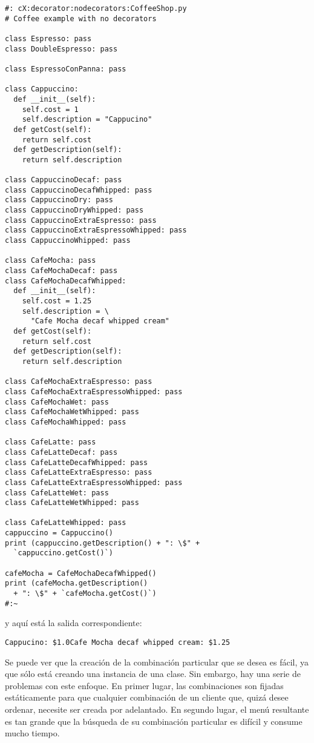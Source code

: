 \begin{lstlisting}
#: cX:decorator:nodecorators:CoffeeShop.py 
# Coffee example with no decorators 

class Espresso: pass 
class DoubleEspresso: pass

class EspressoConPanna: pass 

class Cappuccino: 
  def __init__(self): 
    self.cost = 1 
    self.description = "Cappucino" 
  def getCost(self): 
    return self.cost 
  def getDescription(self): 
    return self.description 
    
class CappuccinoDecaf: pass 
class CappuccinoDecafWhipped: pass 
class CappuccinoDry: pass 
class CappuccinoDryWhipped: pass 
class CappuccinoExtraEspresso: pass 
class CappuccinoExtraEspressoWhipped: pass 
class CappuccinoWhipped: pass 

class CafeMocha: pass 
class CafeMochaDecaf: pass 
class CafeMochaDecafWhipped: 
  def __init__(self): 
    self.cost = 1.25 
    self.description = \ 
      "Cafe Mocha decaf whipped cream" 
  def getCost(self): 
    return self.cost 
  def getDescription(self): 
    return self.description 
    
class CafeMochaExtraEspresso: pass 
class CafeMochaExtraEspressoWhipped: pass 
class CafeMochaWet: pass 
class CafeMochaWetWhipped: pass 
class CafeMochaWhipped: pass 

class CafeLatte: pass 
class CafeLatteDecaf: pass 
class CafeLatteDecafWhipped: pass 
class CafeLatteExtraEspresso: pass 
class CafeLatteExtraEspressoWhipped: pass 
class CafeLatteWet: pass 
class CafeLatteWetWhipped: pass 

class CafeLatteWhipped: pass 
cappuccino = Cappuccino() 
print (cappuccino.getDescription() + ": \$" +  
  `cappuccino.getCost()`) 
  
cafeMocha = CafeMochaDecafWhipped() 
print (cafeMocha.getDescription() 
  + ": \$" + `cafeMocha.getCost()`) 
#:~ 
\end{lstlisting}

y aquí está la salida correspondiente: \newline

\begin{lstlisting} 
Cappucino: $1.0Cafe Mocha decaf whipped cream: $1.25
\end{lstlisting}

Se puede ver que la creación de la combinación particular que se desea es fácil, ya que sólo está creando una instancia de una clase. Sin embargo, hay una serie de problemas con este enfoque. En primer lugar, las combinaciones son fijadas estáticamente para que cualquier combinación de un cliente que, quizá desee ordenar, necesite ser creada por adelantado. En segundo lugar, el menú resultante es tan grande que la búsqueda de su combinación particular es difícil y consume mucho tiempo.     \newline


